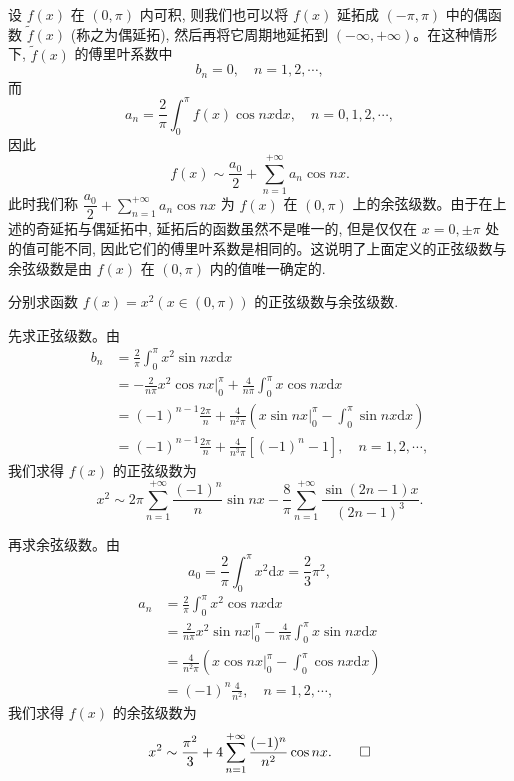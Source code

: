 设 $f(x)$ 在 $(0,\pi)$ 内可积, 则我们也可以将 $f(x)$ 延拓成 $(-\pi,\pi)$ 中的偶函数 $\widetilde f(x)$ (称之为偶延拓), 然后再将它周期地延拓到 $(-\infty,+\infty)$。在这种情形下, $\widetilde f(x)$ 的傅里叶系数中
\[
  b_n=0,\quad n=1,2,\cdots,
\]
而
\[
  a_n=\frac2\pi\int_0^\pi f(x)\cos nx\mathrm dx,\quad n=0,1,2,\cdots,
\]
因此
\[
  f(x)\sim\frac{a_0}{2}+\sum_{n=1}^{+\infty}a_n\cos nx.
\]
此时我们称 $\dfrac{a_0}{2}+\sum\limits_{n=1}^{+\infty}a_n\cos nx$ 为 $f(x)$ 在 $(0,\pi)$ 上的余弦级数。由于在上述的奇延拓与偶延拓中, 延拓后的函数虽然不是唯一的, 但是仅仅在 $x=0,\pm\pi$ 处的值可能不同, 因此它们的傅里叶系数是相同的。这说明了上面定义的正弦级数与余弦级数是由 $f(x)$ 在 $(0,\pi)$ 内的值唯一确定的.

\begin{example}\label{example:ma-12-1-4}
分别求函数 $f(x)=x^2(x\in(0,\pi))$ 的正弦级数与余弦级数.
\end{example}


\begin{solve}
先求正弦级数。由
\[
\begin{aligned}
  b_n
  &=\frac2\pi\int_0^\pi x^2\sin nx\mathrm dx\\
  &=-\frac2{n\pi}x^2\cos nx\bigg|_0^\pi
    +\frac4{n\pi}\int_0^\pi x\cos nx\mathrm dx\\
  &=(-1)^{n-1}\frac{2\pi}{n}
    +\frac4{n^2\pi}\left(x\sin nx\bigg|_0^\pi-\int_0^\pi\sin nx\mathrm dx\right)\\
  &=(-1)^{n-1}\frac{2\pi}{n}
    +\frac4{n^3\pi}[(-1)^n-1],\quad n=1,2,\cdots,
\end{aligned}
\]
我们求得 $f(x)$ 的正弦级数为
\[
  x^2\sim
  2\pi\sum_{n=1}^{+\infty}\frac{(-1)^n}{n}\sin nx
  -\frac8\pi\sum_{n=1}^{+\infty}\frac{\sin(2n-1)x}{(2n-1)^3}.
\]

再求余弦级数。由
\[
  a_0=\frac2\pi\int_0^\pi x^2\mathrm dx=\frac23\pi^2,
\]
\[
\begin{aligned}
  a_n
  &=\frac2\pi\int_0^\pi x^2\cos nx\mathrm dx\\
  &=\frac2{n\pi}x^2\sin nx\bigg|_0^\pi
    -\frac4{n\pi}\int_0^\pi x\sin nx\mathrm dx\\
  &=\frac4{n^2\pi}\left(x\cos nx\bigg|_0^\pi-\int_0^\pi\cos nx\mathrm dx\right)\\
  &=(-1)^n\frac4{n^2},\quad n=1,2,\cdots,
\end{aligned}
\]
我们求得 $f(x)$ 的余弦级数为
\[
  x^2\sim\frac{\pi^2}{3}
  +4\sum_{n=1}^{+\infty}\frac{(-1)^n}{n^2}\cos nx.
\qedhere
\]
\end{solve}


